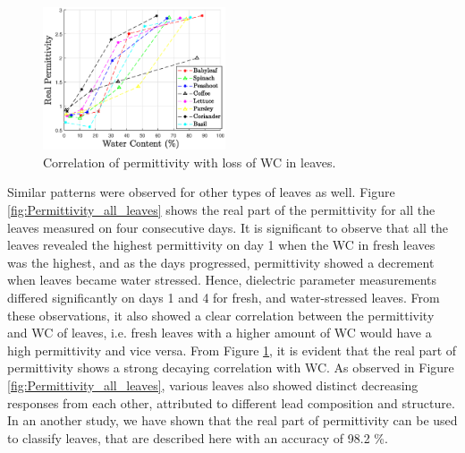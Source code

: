 \documentclass[preprints,article,accept,moreauthors,pdftex]{Definitions/mdpi}
\renewcommand{\^}{\hat}  %
\begin{document}
\begin{figure}[t!]
	\centering
	\includegraphics[width=0.48\textwidth]{perm_with_water_content2.eps}
	\caption{{Correlation of permittivity with loss of WC in leaves.}}
	\label{fig:correlation_perm}
\end{figure}
% 
{Similar patterns were observed for other types of leaves as well.} Figure \ref{fig:Permittivity_all_leaves} {shows} the real part of the permittivity for all the leaves measured on four consecutive days. It {is} significant to observe that all the leaves revealed the highest permittivity on day 1 when the WC in fresh leaves {was the highest}, and as the days progressed, permittivity showed a decrement when leaves became water stressed. Hence, dielectric parameter measurements differed significantly on {days} 1 and 4 for fresh, and water-stressed leaves. From these observations, it also showed a clear correlation between the permittivity and WC of leaves, i.e. fresh leaves with a higher amount of WC would have a high permittivity and vice versa. From Figure \ref{fig:correlation_perm}, it {is evident that the real part of }permittivity {shows} a strong decaying correlation with WC. As observed in Figure \ref{fig:Permittivity_all_leaves}, various leaves also showed {distinct decreasing responses from each other, attributed to different lead composition and structure. In an another study, we have shown that the real part of permittivity can be used to classify leaves, that are described here with an accuracy of 98.2 \%.}
\end{document}
